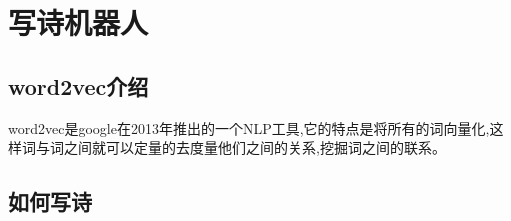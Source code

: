 \chapter{写诗机器人}
\label{chap:java_ex_poem}

\section{word2vec介绍}
word2vec是google在2013年推出的一个NLP工具,它的特点是将所有的词向量化,这样词与词之间就可以定量的去度量他们之间的关系,挖掘词之间的联系。

\section{如何写诗}


